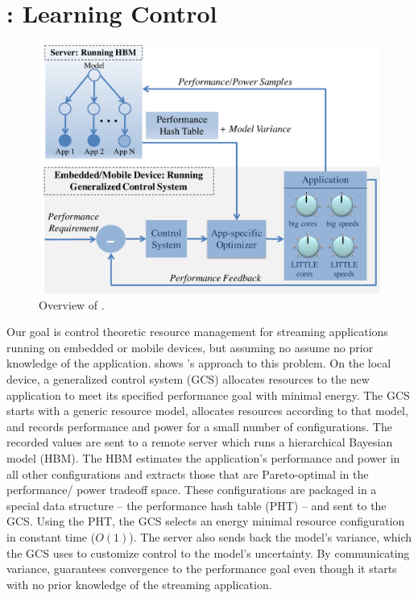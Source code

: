 \section{\SYSTEM{}: Learning Control}
\label{sec:framework}



\begin{figure}
\includegraphics[width=\columnwidth]{figures/ControlLearning.pdf}
\caption{Overview of \SYSTEM{}.}
\label{fig:overview}
\end{figure}


Our goal is control theoretic resource management for streaming
applications running on embedded or mobile devices, but assuming no
assume no prior knowledge of the application.  
shows \SYSTEM{}'s approach to this problem.  On the local device, a
generalized control system (GCS) allocates resources to the new
application to meet its specified performance goal with minimal
energy.  The GCS starts with a generic resource model, allocates
resources according to that model, and records performance and power
for a small number of configurations.  The recorded values are sent to
a remote server which runs a hierarchical Bayesian model (HBM).  The
HBM estimates the application's performance and power in all other
configurations and extracts those that are Pareto-optimal in the
performance/ power tradeoff space.  These configurations are packaged
in a special data structure -- the performance hash table (PHT) -- and
sent to the GCS.  Using the PHT, the GCS selects an energy minimal
resource configuration in constant time ($O(1)$).  The server also
sends back the model's variance, which the GCS uses to customize
control to the model's uncertainty. By communicating variance,
\SYSTEM{} guarantees convergence to the performance goal even though
it starts with no prior knowledge of the streaming application.

